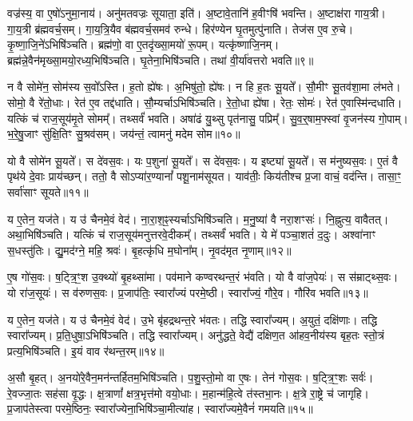 वज्र॑स्य॒ वा ए॒षो॑\-ऽनुमा॒नाय॑।
अनु॑मतवज्रः सूयाता॒ इति॑।
अ॒ष्टावे॒तानि॑ ह॒वीꣳषि॑ भवन्ति।
अ॒ष्टाक्ष॑रा गाय॒त्री।
गा॒य॒त्री ब्र॑ह्म\-वर्च॒सम्।
गा॒य॒त्रि॒यैव ब॑ह्म\-वर्च॒समव॑ रुन्धे।
हिर॑ण्येन घृ॒तमुत्पु॑नाति।
तेज॑स ए॒व रु॒चे।
कृ॒ष्णा॒जि॒ने॑\-ऽभिषि॑ञ्चति।
ब्रह्म॑णो॒ वा ए॒तदृ॑ख्सा॒मयो॑ रू॒पम्।
यत्कृ॑ष्णाजि॒नम्।
ब्रह्म॑न्ने॒वैन॑मृख्सा॒मयो॒रध्य॒भिषि॑ञ्चति।
घृ॒तेना॒भिषि॑ञ्चति।
तथा॑ वी॒र्या॑वत्तरो भवति॥९॥\ip\anuvakamend[स॒ङ्गच्छे॑ते भाग॒धेये॒नान्व॑मन्येताꣳ रू॒पं च॒त्वारि॑ च]

न वै सोमे॑न॒ सोम॑स्य स॒वो᳚\-ऽस्ति।
ह॒तो ह्ये॑षः।
अ॒भिषु॑तो॒ ह्ये॑षः।
न हि ह॒तः सू॒यते᳚।
सौ॒मीꣳ सू॒तव॑शा॒मा ल॑भते।
सोमो॒ वै रे॑तो॒धाः।
रेत॑ ए॒व तद्द॑धाति।
सौ॒म्यर्चा\-ऽभिषि॑ञ्चति।
रे॒तो॒धा ह्ये॑षा।
रेतः॒ सोमः॑।
रेत॑ ए॒वास्मि॑न्दधाति।
यत्किं च॑ राज॒सूय॑मृ॒ते सोमम्᳚।
तथ्सर्वं॑ भवति।
अषा॑ढं यु॒थ्सु पृत॑नासु॒ पप्रिम्᳚।
सु॒व॒र्॒षाम॒फ्स्वां वृ॒जन॑स्य गो॒पाम्।
भ॒रे॒षु॒जाꣳ सु॑क्षि॒तिꣳ सु॒श्रव॑सम्।
जय॑न्तं॒ त्वामनु॑ मदेम सोम॥१०॥\ip\anuvakamend[रेतः॒ सोमः॑ स॒प्त च॑]

यो वै सोमे॑न सू॒यते᳚।
स दे॑वस॒वः।
यः प॒शुना॑ सू॒यते᳚।
स दे॑वस॒वः।
य इष्ट्या॑ सू॒यते᳚।
स म॑नुष्यस॒वः।
ए॒तं वै पृथ॑ये दे॒वाः प्राय॑च्छन्।
ततो॒ वै सोऽप्या॑र॒ण्यानां᳚ पशू॒नाम॑सूयत।
याव॑तीः॒ किय॑तीश्च प्र॒जा वाचं॒ वद॑न्ति।
तासा॒ꣳ॒ सर्वा॑साꣳ सूयते॥११॥\ip

य ए॒तेन॒ यज॑ते।
य उ॑ चैनमे॒वं वेद॑।
ना॒रा॒श॒ꣴ॒स्यर्चा\-ऽभिषि॑ञ्चति।
म॒नु॒ष्या॑ वै नरा॒शꣳसः॑।
नि॒ह्नुत्य॒ वावैतत्।
अथा॒भिषि॑ञ्चति।
यत्किं च॑ राज॒सूय॑मनुत्तरवे॒दीकम्᳚।
तथ्सर्वं॑ भवति।
ये मे॑ पञ्चा॒शतं॑ द॒दुः।
अश्वा॑नाꣳ स॒धस्तु॑तिः।
द्यु॒मद॑ग्ने॒ महि॒ श्रवः॑।
बृ॒हत्कृ॑धि म॒घोना᳚म्।
नृ॒वद॑मृत नृ॒णाम्॥१२॥\ip\anuvakamend[सू॒य॒ते॒ स॒धस्तु॑ति॒स्त्रीणि॑ च]

ए॒ष गो॑स॒वः।
ष॒ट्त्रि॒ꣳ॒श उ॒क्थ्यो॑ बृ॒हथ्सा॑मा।
पव॑माने कण्वरथन्त॒रं भ॑वति।
यो वै वा॑ज॒पेयः॑।
स स॑म्राट्थ्स॒वः।
यो रा॑ज॒सूयः॑।
स व॑रुणस॒वः।
प्र॒जा\-प॑तिः॒ स्वारा᳚ज्यं परमे॒ष्ठी।
स्वारा᳚ज्यं॒ गौरे॒व।
गौरि॑व भवति॥१३॥\ip

य ए॒तेन॒ यज॑ते।
य उ॑ चैनमे॒वं वेद॑।
उ॒भे बृ॑हद्रथन्त॒रे भ॑वतः।
तद्धि स्वारा᳚ज्यम्।
अ॒युतं॒ दक्षि॑णाः।
तद्धि स्वारा᳚ज्यम्।
प्र॒ति॒धुषा॒\-ऽभिषि॑ञ्चति।
तद्धि स्वारा᳚ज्यम्।
अनु॑द्धते॒ वेद्यै॑ दक्षिण॒त आ॑\-हव॒नी\-य॑स्य बृह॒तः स्तो॒त्रं प्रत्य॒भिषि॑ञ्चति।
इ॒यं वाव र॑थन्त॒रम्॥१४॥\ip

अ॒सौ बृ॒हत्।
अ॒नयो॑रे॒वैन॒मन॑न्तर्\mbox{}हितम॒भिषि॑ञ्चति।
प॒शु॒स्तो॒मो वा ए॒षः।
तेन॑ गोस॒वः।
ष॒ट्त्रि॒ꣳ॒शः सर्वः॑।
रे॒वज्जा॒तः सह॑सा वृ॒द्धः।
क्ष॒त्राणां᳚ क्षत्र॒भृत्त॑मो वयो॒धाः।
म॒हान्म॑हि॒त्वे त॑स्तभा॒नः।
क्ष॒त्रे रा॒ष्ट्रे च॑ जागृहि।
प्र॒जा\-प॑तेस्त्वा परमे॒ष्ठिनः॒ स्वारा᳚ज्येना॒भिषि॑ञ्चा॒मीत्या॑ह।
स्वारा᳚ज्यमे॒वैनं॑ गमयति॥१५॥\ip\anuvakamend[इ॒व॒ भ॒व॒ति॒ र॒थ॒न्त॒रमा॒हैकं॑ च]

